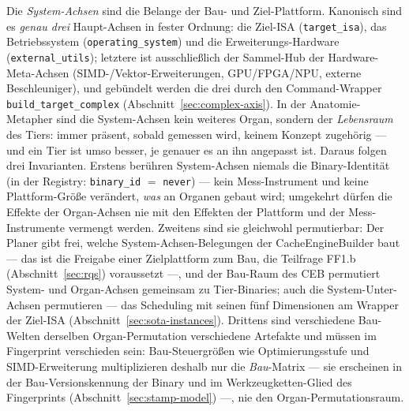\begin{nurlang}
Die \emph{System-Achsen} sind die Belange der Bau- und Ziel-Plattform. Kanonisch sind es \emph{genau
drei} Haupt-Achsen in fester Ordnung: die Ziel-ISA (\texttt{target\_isa}), das Betriebssystem
(\texttt{operating\_system}) und die Erweiterungs-Hardware (\texttt{external\_utils}); letztere ist
ausschließlich der Sammel-Hub der Hardware-Meta-Achsen (SIMD-/Vektor-Erweiterungen, GPU/FPGA/NPU,
externe Beschleuniger), und gebündelt werden die drei durch den Command-Wrapper
\texttt{build\_target\_complex} (Abschnitt~\ref{sec:complex-axis}). In der Anatomie-Metapher sind die
System-Achsen kein weiteres Organ, sondern der \emph{Lebensraum} des Tiers: immer präsent, sobald
gemessen wird, keinem Konzept zugehörig --- und ein Tier ist umso besser, je genauer es an ihn angepasst
ist. Daraus folgen drei Invarianten. Erstens berühren System-Achsen niemals die Binary-Identität
(in der Registry: \texttt{binary\_id} $=$ \texttt{never}) --- kein Mess-Instrument und keine Plattform-Größe
verändert, \emph{was} an Organen gebaut wird; umgekehrt dürfen die Effekte der Organ-Achsen nie mit den
Effekten der Plattform und der Mess-Instrumente vermengt werden. Zweitens sind sie gleichwohl
permutierbar: Der Planer gibt frei, welche System-Achsen-Belegungen der CacheEngineBuilder baut ---
das ist die Freigabe einer Zielplattform zum Bau, die Teilfrage FF1.b (Abschnitt~\ref{sec:rqs})
voraussetzt ---, und
der Bau-Raum des CEB permutiert System- und Organ-Achsen gemeinsam zu Tier-Binaries; auch die
System-Unter-Achsen permutieren --- das Scheduling mit seinen fünf Dimensionen am Wrapper der Ziel-ISA
(Abschnitt~\ref{sec:sota-instances}). Drittens sind verschiedene Bau-Welten derselben
Organ-Permutation verschiedene Artefakte und müssen im Fingerprint verschieden sein: Bau-Steuergrößen
wie Optimierungsstufe und SIMD-Erweiterung multiplizieren deshalb nur die \emph{Bau}-Matrix --- sie
erscheinen in der Bau-Versionskennung der Binary und im Werkzeugketten-Glied des Fingerprints
(Abschnitt~\ref{sec:stamp-model}) ---, nie den Organ-Permutationsraum.
\end{nurlang}
